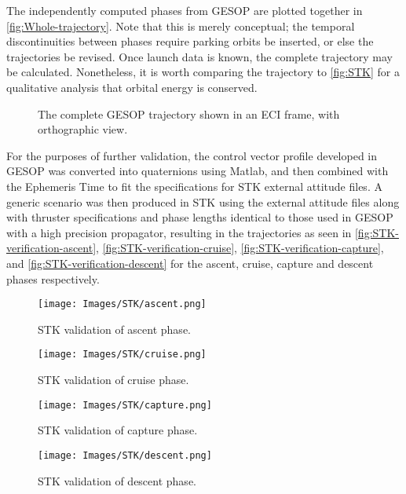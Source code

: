 The independently computed phases from GESOP are plotted together in \autoref{fig:Whole-trajectory}. Note that this is merely conceptual; the temporal discontinuities between phases require parking orbits be inserted, or else the trajectories be revised. Once launch data is known, the complete trajectory may be calculated. Nonetheless, it is worth comparing the trajectory to \autoref{fig:STK} for a qualitative analysis that orbital energy is conserved.

\begin{figure}
\centering
\def\svgwidth{\textwidth}

\caption{The complete GESOP trajectory shown in an ECI frame, with orthographic view.} \label{fig:Whole-trajectory}
\end{figure}

For the purposes of further validation, the control vector profile developed in GESOP was converted into quaternions using Matlab, and then combined with the Ephemeris Time to fit the specifications for STK external attitude files. A generic scenario was then produced in STK using the external attitude files along with thruster specifications and phase lengths identical to those used in GESOP with a high precision propagator, resulting in the trajectories as seen in \autoref{fig:STK-verification-ascent}, \autoref{fig:STK-verification-cruise}, \autoref{fig:STK-verification-capture}, and \autoref{fig:STK-verification-descent} for the ascent, cruise, capture and descent phases respectively.

\begin{figure}
\centering
\texttt{[image: Images/STK/ascent.png]}
\caption{STK validation of ascent phase.} \label{fig:STK-verification-ascent}
\end{figure}


\begin{figure}
\centering
\texttt{[image: Images/STK/cruise.png]}
\caption{STK validation of cruise phase.} \label{fig:STK-verification-cruise}
\end{figure}


\begin{figure}
\centering
\texttt{[image: Images/STK/capture.png]}
\caption{STK validation of capture phase.} \label{fig:STK-verification-capture}
\end{figure}


\begin{figure}
\centering
\texttt{[image: Images/STK/descent.png]}
\caption{STK validation of descent phase.} \label{fig:STK-verification-descent}
\end{figure}

